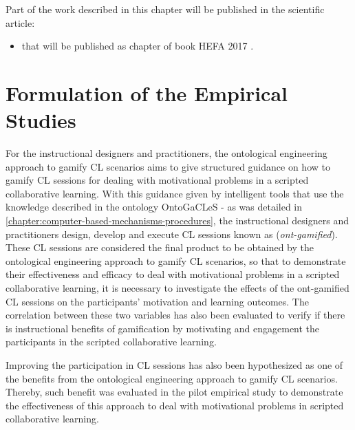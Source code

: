 Part of the work described in this chapter will be published in the scientific article:

\begin{itemize}
\item
{} that will be published as chapter of book  HEFA 2017 \cite{ChallcoMizoguchiIsotani2018}.
\end{itemize}

\section{Formulation of the Empirical Studies}
\label{sec:formulation-empirical-studies}

For the instructional designers and practitioners, the ontological engineering approach to gamify CL scenarios aims to give structured guidance on how to gamify CL sessions for dealing with motivational problems in a scripted collaborative learning.
With this guidance given by intelligent tools that use the knowledge described in the ontology OntoGaCLeS - as was detailed in \autoref{chapter:computer-based-mechanisms-procedures}, the instructional designers and practitioners design, develop and execute CL sessions known as  (\emph{ont-gamified}).
These CL sessions are considered the final product to be obtained by the ontological engineering approach to gamify CL scenarios, so that to demonstrate their effectiveness and efficacy to deal with motivational problems in a scripted collaborative learning, it is necessary to investigate the effects of the ont-gamified CL sessions on the participants' motivation and learning outcomes.
The correlation between these two variables has also been evaluated to verify if there is instructional benefits of gamification by motivating and engagement the participants in the scripted collaborative learning.

Improving the participation in CL sessions has also been hypothesized as one of the benefits from the ontological engineering approach to gamify CL scenarios.
Thereby, such benefit was evaluated in the pilot empirical study to demonstrate the effectiveness of this approach to deal with motivational problems in scripted collaborative learning.

